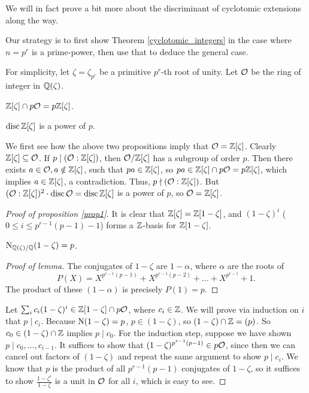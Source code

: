 \documentclass[11pt]{amsart}
\begin{document}
We will in fact prove a bit more about the discriminant of cyclotomic extensions along the way.

Our strategy is to first show Theorem \ref{cyclotomic_integers} in the case where $n = p^r$ is a prime-power, then use that to deduce the general case. 

For simplicity, let $\zeta = \zeta_{p^r}$ be a primitive $p^r$-th root of unity. Let $\mathcal{O}$ be the ring of integer in $\mathbb{Q}(\zeta)$.

\begin{prop}
\label{prop1}
$\mathbb{Z}[\zeta]\cap p\mathcal{O} = p\mathbb{Z}[\zeta]$.
\end{prop}

\begin{prop}
\label{prop2}
$\operatorname{disc} \mathbb{Z}[\zeta]$ is a power of $p$.
\end{prop}

We first see how the above two propositions imply that $\mathcal{O} = \mathbb{Z}[\zeta]$. Clearly $\mathbb{Z}[\zeta] \subseteq \mathcal{O}$. If $p\mid (\mathcal{O}:\mathbb{Z}[\zeta])$, then $\mathcal{O}/\mathbb{Z}[\zeta]$ has a subgroup of order $p$. Then there exists $a\in \mathcal{O}, a\notin \mathbb{Z}[\zeta]$, such that $pa\in \mathbb{Z}[\zeta]$, so $pa\in \mathbb{Z}[\zeta]\cap p\mathcal{O} = p\mathbb{Z}[\zeta]$, which implies $a\in \mathbb{Z}[\zeta]$, a contradiction. Thus, $p\nmid (\mathcal{O}:\mathbb{Z}[\zeta])$. But $(\mathcal{O}:\mathbb{Z}[\zeta])^2\cdot \operatorname{disc} \mathcal{O} = \operatorname{disc} \mathbb{Z}[\zeta]$ is a power of $p$, so $\mathcal{O} = \mathbb{Z}[\zeta]$.

\begin{proof}[Proof of proposition \ref{prop1}]
It is clear that $\mathbb{Z}[\zeta] = \mathbb{Z}[1-\zeta]$, and $(1-\zeta)^i$ ($0\le i\le p^{r-1}(p-1)-1$) forms a $\mathbb{Z}$-basis for $\mathbb{Z}[1-\zeta]$.

\begin{Lem}
$\operatorname{N}_{\mathbb{Q}(\zeta)/\mathbb{Q}}(1-\zeta) = p$.
\end{Lem}
\begin{proof}[Proof of lemma]
The conjugates of $1-\zeta$ are $1-\alpha$, where $\alpha$ are the roots of 
\[P(X) = X^{p^{r-1}(p-1)} + X^{p^{r-1}(p-2)} + \dots + X^{p^{r-1}} + 1.\]
The product of these $(1-\alpha)$ is precisely $P(1) = p$.
\end{proof}


Let $\sum_i c_i(1-\zeta)^i \in \mathbb{Z}[1-\zeta]\cap p\mathcal{O}$, where $c_i\in \mathbb{Z}$. We will prove via induction on $i$ that $p\mid c_i$. Because $\operatorname{N}(1-\zeta) = p$, $p\in (1-\zeta)$, so $(1-\zeta)\cap \mathbb{Z} = (p)$. So $c_0 \in (1-\zeta)\cap \mathbb{Z}$ implies $p\mid c_0$. For the induction step, suppose we have shown $p\mid c_0,\dots,c_{i-1}$. It suffices to show that $(1-\zeta)^{p^{r-1}(p-1)} \in p\mathcal{O}$, since then we can cancel out factors of $(1-\zeta)$ and repeat the same argument to show $p\mid c_i$. We know that $p$ is the product of all $p^{r-1}(p-1)$ conjugates of $1-\zeta$, so it suffices to show $\frac{1-\zeta^i}{1-\zeta}$ is a unit in $\mathcal{O}$ for all $i$, which is easy to see.
\end{proof}
\end{document}
